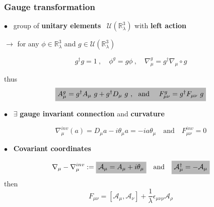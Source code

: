 \documentclass[9pt]{beamer}
\begin{document}
\begin{frame}

\frametitle{Gauge transformation}

$\bullet$ \ group of \textbf{unitary elements} \ $\mathcal{U}\left(\mathbb{R}^3_\lambda\right)$ with \textbf{left action}

\qquad $\to$ for any $\phi\in\mathbb{R}^3_\lambda$ and $g\in\mathcal{U}\left(\mathbb{R}^3_\lambda\right)$

\begin{equation*}
g^\dagger g = 1 \ , \quad \phi^g = g \phi \ , \quad \nabla_\mu^g = g^\dagger \nabla_\mu \circ g
\end{equation*}

thus
\vspace*{-1pt}
\begin{equation*}
\tikz[baseline]{\node[fill=black!28!white,anchor=base] (t1) {$A_\mu^g = g^\dagger A_\mu \ g + g^\dagger D_\mu \ g \ , \ \ \mbox{and } \quad F^g_{\mu\nu} = g^\dagger F_{\mu\nu} \ g$};}
\end{equation*}
\vspace*{1pt}

$\bullet$ \ $\exists$ \textbf{gauge invariant connection} and \textbf{curvature}

\begin{equation*} 
\nabla^{inv}_\mu(a) = D_\mu a - i \theta_\mu a = - i a \theta_\mu \quad \mbox{and} \quad F^{inv}_{\mu\nu}=0
\end{equation*}

$\bullet$ \ \textbf{Covariant coordinates}

\begin{equation*}
\nabla_\mu - \nabla^{inv}_\mu := \tikz[baseline]{\node[fill=black!28!white,anchor=base] (t1) {$\mathcal{A}_\mu = A_\mu + i \theta_\mu$};} \quad \mbox{and} \quad \tikz[baseline]{\node[fill=black!28!white,anchor=base] (t1) {$\mathcal{A}_\mu^\dag = - \mathcal{A}_\mu$};}
\end{equation*}
then
\vspace*{-2pt}
\begin{equation*} 
F_{\mu\nu} = \left[\mathcal{A}_\mu,\mathcal{A}_\nu\right] + \frac{1}{\lambda} \epsilon_{\mu\nu\rho} \mathcal{A}_\rho
\end{equation*}

\end{frame}

\end{document}
